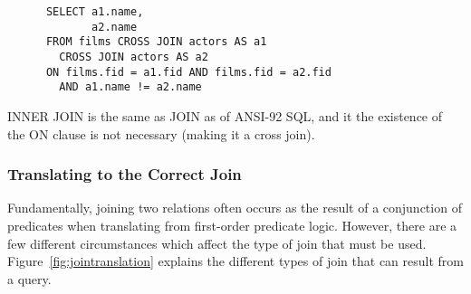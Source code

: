 \documentclass[a4paper, 11pt]{article}
\begin{document}
      \begin{verbatim}
      SELECT a1.name,
             a2.name
      FROM films CROSS JOIN actors AS a1
        CROSS JOIN actors AS a2
      ON films.fid = a1.fid AND films.fid = a2.fid 
        AND a1.name != a2.name
      \end{verbatim}

      INNER JOIN is the same as JOIN as of ANSI-92 SQL, and it the existence of
      the ON clause is not necessary (making it a cross join).

    \subsubsection{Translating to the Correct Join}

      Fundamentally, joining two relations often occurs as the result of a
      conjunction of predicates when translating from first-order predicate
      logic. However, there are a few different circumstances which affect the
      type of join that must be used. Figure~\ref{fig:jointranslation} explains
      the different types of join that can result from a query.
\end{document}
